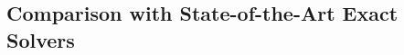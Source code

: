 \documentclass[letterpaper,journal]{IEEEtran}
\begin{document}

\subsection{Comparison with State-of-the-Art Exact Solvers}
\end{document}
